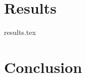 \documentclass[a4paper,11pt]{report}
\begin{document}
\chapter{Results}
{results.tex}

\chapter{Conclusion}


\clearpage
{}
%

 

\end{document}

